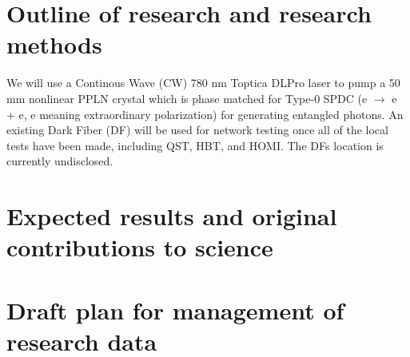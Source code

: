\documentclass{article}
\theoremstyle{mytheoremstyle}
\theoremstyle{mytheoremstyle}
\theoremstyle{myproblemstyle}
\begin{document}
\newpage
\section{Outline of research and research methods}
We will use a Continous Wave (CW) 780 nm Toptica DLPro laser to pump a 50 mm nonlinear PPLN crystal which is phase matched for Type-0 SPDC (e $\rightarrow$ e + e, e meaning extraordinary polarization)
for generating entangled photons.
An existing Dark Fiber (DF) will be used for network testing once all of the local tests have been made, including QST, HBT, and HOMI.
The DFs location is currently undisclosed.

\newpage
\section{Expected results and original contributions to science}
\section{Draft plan for management of research data}
\end{document}
